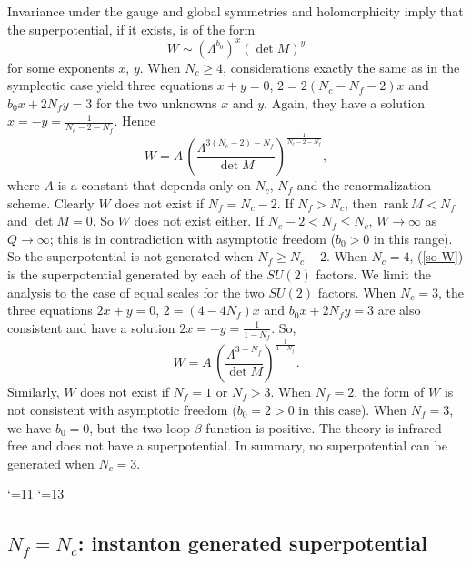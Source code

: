 \documentclass[lecture]{qft-l}
\newcommand{\Lam}{\varLambda}
\newcommand{\inv}[1]{\frac{1}{#1}}
\newcommand{\rank}{\mathrm{\,rank\,}}
\def\Subhead#1{\subsection*{#1}}
\begin{document}
\medskip\noindent
Invariance under the gauge and global symmetries and holomorphicity
imply that the superpotential, if it exists, is of the form
	\begin{equation}
W\sim(\Lam^{b_0})^x(\det M)^y
	\end{equation}
for some exponents $x$, $y$.
When $N_c\ge4$, considerations exactly the same as in the symplectic case 
yield three equations $x+y=0$, $2=2(N_c-N_f-2)x$ and $b_0x+2N_fy=3$
for the two unknowns $x$ and $y$.
Again, they have a solution $x=-y=\inv{N_c-2-N_f}$.
Hence
	\begin{equation}\label{so-W}
W=A\,\left(\frac{\Lam^{3(N_c-2)-N_f}}{\det M}\right)^{\inv{N_c-2-N_f}},
	\end{equation}
where $A$ is a constant that depends only on $N_c$, $N_f$ and the
renormalization scheme.
Clearly $W$ does not exist if $N_f=N_c-2$.
If $N_f>N_c$, then $\rank M<N_f$ and $\det M=0$.
So $W$ does not exist either.
If $N_c-2<N_f\le N_c$, $W\to\infty$ as $Q\to\infty$;
this is in contradiction with asymptotic freedom ($b_0>0$ in this range).
So the superpotential is not generated when $N_f\ge N_c-2$.
When $N_c=4$, (\ref{so-W}) is the superpotential generated by each of 
the $SU(2)$ factors.
We limit the analysis to the case of equal scales for the two $SU(2)$ factors.
When $N_c=3$, the three equations $2x+y=0$, $2=(4-4N_f)x$ and $b_0x+2N_fy=3$
are also consistent and have a solution $2x=-y=\inv{1-N_f}$.
So,
	\begin{equation}
W=A\,\left(\frac{\Lam^{3-N_f}}{\det M}\right)^{\inv{1-N_f}}.
	\end{equation}
Similarly, $W$ does not exist if $N_f=1$ or $N_f>3$.
When $N_f=2$, the form of $W$ is not consistent with asymptotic freedom
($b_0=2>0$ in this case).
When $N_f=3$, we have $b_0=0$, but the two-loop $\beta$-function is positive.
The theory is infrared free and does not have a superpotential.
In summary, no superpotential can be generated when $N_c=3$.



\catcode`\@=11
\catcode`\@=13


\Subhead{{\boldmath $N_f=N_c$}: instanton generated superpotential}
\end{document}
